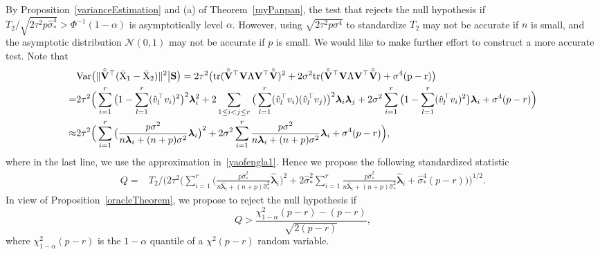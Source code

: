 \documentclass[times,sort&compress,3p]{elsarticle}
\newcommand{\mytr}{\rm tr}
\newcommand{\myVar}{\rm Var}
\newcommand{\bfsym}[1]{\ensuremath{\boldsymbol{#1}}}
\def\blambda {\bfsym {\lambda}}        \def\bLambda {\bfsym {\Lambda}}
\theoremstyle{plain}
\theoremstyle{definition}
\theoremstyle{remark}
\begin{document}
By Proposition~\ref{varianceEstimation} and (a) of Theorem~\ref{myPanpan}, the test that rejects the null hypothesis if
$
T_2/\sqrt{2\tau^2 p\hat{\sigma}^4_*}>\Phi^{-1}(1-\alpha)
$
is asymptotically level $\alpha$.
However, using $\sqrt{2\tau^2 p\sigma^4}$ to standardize $T_2$ may not be accurate if $n$ is small, and the asymptotic distribution $\mathcal{N}(0,1)$ may not be accurate if $p$ is small.
We would like to make further effort to construct a more accurate test.
Note that
$$
\begin{aligned}
    &\myVar\big(
\|\hat{\tilde{\BV}}^\top  (\bar{X}_1-\bar{X}_2)\|^2
\big| \BS
\big)
    =2\tau^2\big(
\mytr(\hat{\tilde{\BV}}^\top  \BV \bLambda \BV^\top \hat{\tilde{\BV}})^2
+
2\sigma^2\mytr(\hat{\tilde{\BV}}^\top  \BV \bLambda \BV^\top \hat{\tilde{\BV}})
+\sigma^4 (p-r)
\big)
\\
    =&
    2\tau^2\Big(
    \sum_{i=1}^r \big(1-\sum_{l=1}^r (\hat{v}_l^\top  v_i)^2\big)^2 \blambda_i^2
    +2\sum_{1\leq i<j \leq r}\big(\sum_{l=1}^r (\hat{v}_l^\top  v_i)(\hat{v}_l^\top  v_j )\big)^2\blambda_i\blambda_j
    +
    2\sigma^2\sum_{i=1}^r \big(1-\sum_{l=1}^r (\hat{v}_l^\top  v_i)^2\big) \blambda_i
    +\sigma^4 (p-r)
    \Big)
    \\
    \approx&
    2\tau^2\Big(
    \sum_{i=1}^r \big(\frac{p\sigma^2}{n\blambda_i+(n+p)\sigma^2}\blambda_i\big)^2
    +
    2\sigma^2\sum_{i=1}^r \frac{p\sigma^2}{n\blambda_i+(n+p)\sigma^2}\blambda_i
    +\sigma^4 (p-r)
    \Big),
\end{aligned}
$$
where in the last line, we use the approximation in~\eqref{yaofengla1}.
Hence we propose the following standardized statistic
$$
    \begin{aligned}
        Q=&T_2/
   \Bigg( 
        2\tau^2\Big(
        \sum_{i=1}^r \big(\frac{p\hat{\sigma}_*^2}{n\hat{\blambda}_i+(n+p)\hat{\sigma}_*^2}\hat{\blambda}_i\big)^2
    +
        2\hat{\sigma}_*^2\sum_{i=1}^r \frac{p\hat{\sigma}_*^2}{n\hat{\blambda}_i+(n+p)\hat{\sigma}_*^2}\hat{\blambda}_i
        +\hat{\sigma}_*^4 (p-r)
    \Big)\Bigg)^{1/2}.
    \end{aligned}
$$
In view of Proposition~\ref{oracleTheorem}, we propose to reject the null hypothesis if
$$
        Q>\frac{\chi^2_{1-\alpha}(p-r)-(p-r)}{\sqrt{2(p-r)}},
$$
where $\chi^2_{1-\alpha} (p-r)$ is the $1-\alpha$ quantile of a $\chi^2(p-r)$ random variable.
\end{document}

